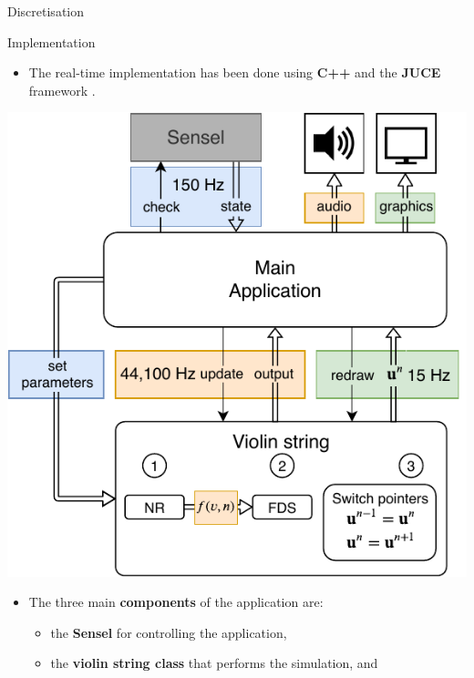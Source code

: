 \documentclass[a0paper,portrait]{baposter}
\let\oldbf\textbf
\renewcommand{\textbf}[1]{\textcolor{aaublue1}{\oldbf{#1}}}
\begin{document}
\begin{poster}
\begin{posterbox}[name=discretisation, column=1, below=elasto2,above=bottom]{Discretisation}
\end{posterbox}

\begin{posterbox}[name=implementation,column=2,row=0]{Implementation}

\begin{itemize}
    \item The real-time implementation has been done using \textbf{C++} and the \textbf{JUCE} framework \cite{JUCE}.
\end{itemize}
\begin{center}
    \includegraphics[width=1.0\columnwidth]{systemArchitecture.pdf}
    \label{fig:systemArch}
\end{center}
\begin{itemize}
    \item The three main \textbf{components} of the application are:
    \begin{itemize}
        \item the \textbf{Sensel} for controlling the application,
        \item the \textbf{violin string class} that performs the simulation, and

\end{itemize}
\end{itemize}
\end{posterbox}
\end{poster}
\end{document}
